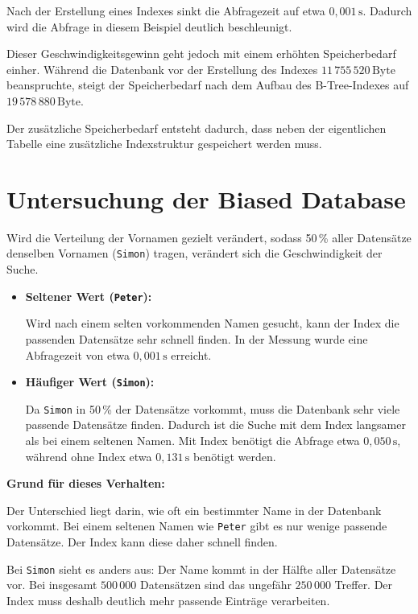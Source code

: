 \documentclass{article}
\begin{document}
Nach der Erstellung eines Indexes 
sinkt die Abfragezeit auf etwa $0{,}001\,\mathrm{s}$. Dadurch wird die
Abfrage in diesem Beispiel deutlich beschleunigt.

Dieser Geschwindigkeitsgewinn geht jedoch mit einem erhöhten
Speicherbedarf einher. Während die Datenbank vor der Erstellung des
Indexes $11\,755\,520\,\mathrm{Byte}$ 
beanspruchte, steigt der Speicherbedarf nach dem Aufbau des
B-Tree-Indexes auf $19\,578\,880\,\mathrm{Byte}$.

Der zusätzliche Speicherbedarf entsteht dadurch, dass neben der
eigentlichen Tabelle eine zusätzliche Indexstruktur gespeichert werden
muss.

\section{Untersuchung der Biased Database}

Wird die Verteilung der Vornamen gezielt verändert, sodass
50\,\% aller Datensätze denselben Vornamen (\texttt{Simon}) tragen,
verändert sich die Geschwindigkeit der Suche.

\begin{itemize}

    \item \textbf{Seltener Wert (\texttt{Peter}):}

    Wird nach einem selten vorkommenden Namen gesucht, kann der Index
    die passenden Datensätze sehr schnell finden. In der Messung wurde
    eine Abfragezeit von etwa $0{,}001\,\mathrm{s}$ erreicht.

    \item \textbf{Häufiger Wert (\texttt{Simon}):}

    Da \texttt{Simon} in 50\,\% der Datensätze vorkommt, muss die
    Datenbank sehr viele passende Datensätze finden. Dadurch ist die
    Suche mit dem Index langsamer als bei einem seltenen Namen.
    Mit Index benötigt die Abfrage etwa $0{,}050\,\mathrm{s}$,
    während ohne Index etwa $0{,}131\,\mathrm{s}$ benötigt werden.

\end{itemize}

\textbf{Grund für dieses Verhalten:}

Der Unterschied liegt darin, wie oft ein bestimmter Name in der
Datenbank vorkommt. Bei einem seltenen Namen wie \texttt{Peter} gibt
es nur wenige passende Datensätze. Der Index kann diese daher schnell
finden.

Bei \texttt{Simon} sieht es anders aus: Der Name kommt in der Hälfte
aller Datensätze vor. Bei insgesamt $500\,000$ Datensätzen sind das
ungefähr $250\,000$ Treffer. Der Index muss deshalb deutlich mehr
passende Einträge verarbeiten.
\end{document}
